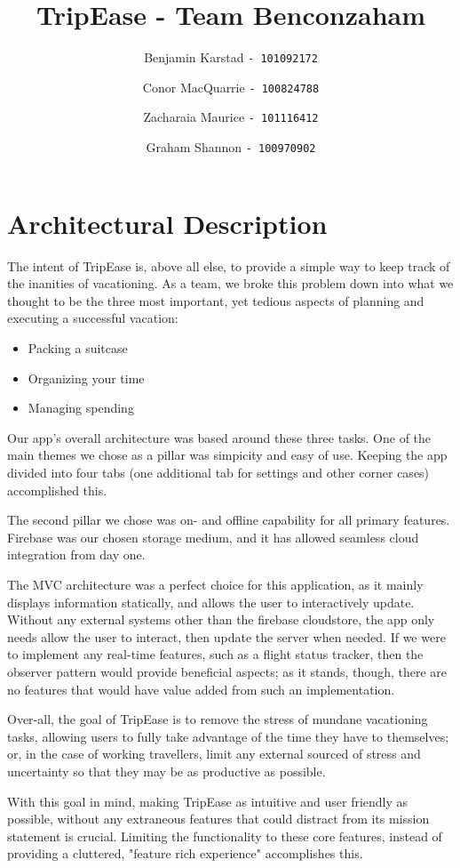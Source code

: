 \documentclass[12pt]{article}
\title{TripEase - Team Benconzaham}
\author{
Benjamin Karstad
\texttt{- 101092172}
\and
Conor MacQuarrie
\texttt{- 100824788}
\and
Zacharaia Maurice
\texttt{- 101116412}
\and
Graham Shannon
\texttt{- 100970902}
}
\begin{document}
	\maketitle
	\pagebreak
	\section*{Architectural Description}
	The intent of TripEase is, above all else, to provide a simple way to keep track of the inanities of vacationing.
	As a team, we broke this problem down into what we thought to be the three most important,
	yet tedious aspects of planning and executing a successful vacation:
	\begin{itemize}
		\item Packing a suitcase
		\item Organizing your time
		\item Managing spending
	\end{itemize}
	Our app's overall architecture was based around these three tasks.
	One of the main themes we chose as a pillar was simpicity and easy of use.
	Keeping the app divided into four tabs (one additional tab for settings and other corner cases) accomplished this.

	The second pillar we chose was on- and offline capability for all primary features.
	Firebase was our chosen storage medium, and it has allowed seamless cloud integration from day one.

	The MVC architecture was a perfect choice for this application, as it mainly displays information statically,
	and allows the user to interactively update.
	Without any external systems other than the firebase cloudstore, the app only needs allow the user to interact,
	then update the server when needed.
	If we were to implement any real-time features, such as a flight status tracker,
	then the observer pattern would provide beneficial aspects;
	as it stands, though, there are no features that would have value added from such an implementation.

	Over-all, the goal of TripEase is to remove the stress of mundane vacationing tasks,
	allowing users to fully take advantage of the time they have to themselves;
	or, in the case of working travellers, limit any external sourced of stress and uncertainty
	so that they may be as productive as possible.

	With this goal in mind, making TripEase as intuitive and user friendly as possible,
	without any extraneous features that could distract from its mission statement is crucial.
	Limiting the functionality to these core features,
	instead of providing a cluttered, "feature rich experience" accomplishes this.
\end{document}
